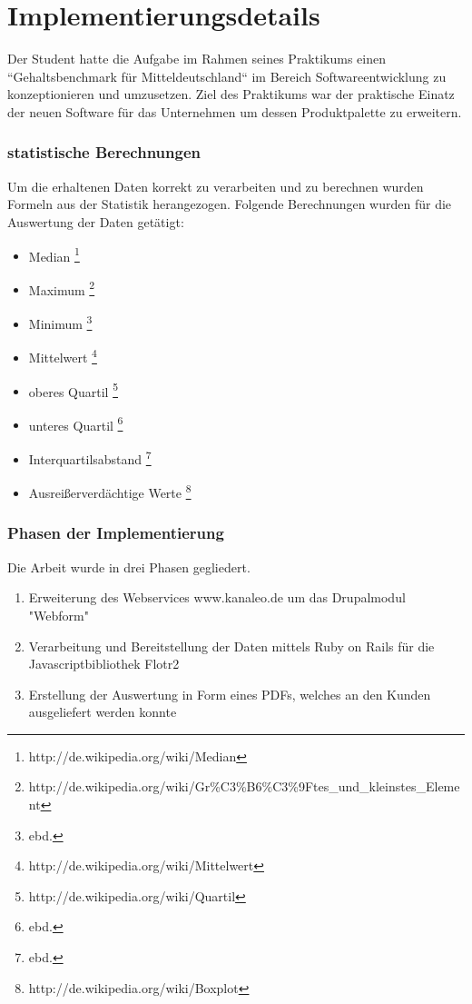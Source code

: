 \part{Implementierungsdetails}
Der Student hatte die Aufgabe im Rahmen seines Praktikums einen
``Gehaltsbenchmark für Mitteldeutschland`` im Bereich  Softwareentwicklung zu
konzeptionieren und umzusetzen. Ziel des Praktikums war der praktische Einatz
der neuen Software für das Unternehmen um dessen Produktpalette zu erweitern.
\section{statistische Berechnungen}
Um die erhaltenen Daten korrekt zu verarbeiten und zu berechnen wurden Formeln
aus der Statistik herangezogen. Folgende Berechnungen wurden für die Auswertung
der Daten getätigt:
\begin{itemize}
  \item Median \footnote{http://de.wikipedia.org/wiki/Median}
  \item Maximum \footnote{http://de.wikipedia.org/wiki/Gr\%C3\%B6\%C3\%9Ftes\_und\_kleinstes\_Element}
  \item Minimum \footnote{ebd.}
  \item Mittelwert \footnote{http://de.wikipedia.org/wiki/Mittelwert}
  \item oberes Quartil \footnote{http://de.wikipedia.org/wiki/Quartil}
  \item unteres Quartil \footnote{ebd.}
  \item Interquartilsabstand \footnote{ebd.}
  \item Ausreißerverdächtige Werte \footnote{http://de.wikipedia.org/wiki/Boxplot}
\end{itemize}
\section{Phasen der Implementierung}
Die Arbeit wurde in drei Phasen gegliedert. 
\begin{enumerate}
  \item Erweiterung des Webservices www.kanaleo.de um das Drupalmodul "Webform" 
  \item Verarbeitung und Bereitstellung der Daten mittels Ruby on Rails für die
Javascriptbibliothek Flotr2 
  \item Erstellung der Auswertung in Form eines PDFs, welches an den Kunden
ausgeliefert werden konnte
\end{enumerate}
